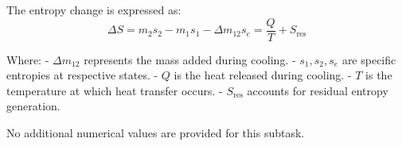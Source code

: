 The entropy change is expressed as:  
\[
\Delta S = m_2 s_2 - m_1 s_1 - \Delta m_{12} s_e = \frac{Q}{T} + S_{\text{res}}
\]  

Where:  
- \( \Delta m_{12} \) represents the mass added during cooling.  
- \( s_1, s_2, s_e \) are specific entropies at respective states.  
- \( Q \) is the heat released during cooling.  
- \( T \) is the temperature at which heat transfer occurs.  
- \( S_{\text{res}} \) accounts for residual entropy generation.  

No additional numerical values are provided for this subtask.